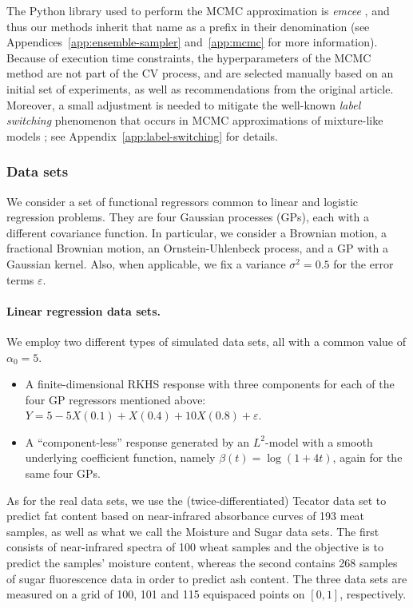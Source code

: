 \documentclass{article}
\numberwithin{equation}{section}
\theoremstyle{plain}
\renewcommand{\epsilon}{\varepsilon}
\begin{document}
The Python library used to perform the MCMC approximation is \textit{emcee} \citep{foreman2013emcee}, and thus our methods inherit that name as a prefix in their denomination (see Appendices~\ref{app:ensemble-sampler} and~\ref{app:mcmc} for more information). Because of execution time constraints, the hyperparameters of the MCMC method are not part of the CV process, and are selected manually based on an initial set of experiments, as well as recommendations from the original article. Moreover, a small adjustment is needed to mitigate the well-known \textit{label switching} phenomenon that occurs in MCMC approximations of mixture-like models \citep[e.g.][]{stephens2000dealing}; see Appendix~\ref{app:label-switching} for details.

\subsubsection*{Data sets}

We consider a set of functional regressors common to linear and logistic regression problems. They are four Gaussian processes (GPs), each with a different covariance function. In particular, we consider a Brownian motion, a fractional Brownian motion, an Ornstein-Uhlenbeck process, and a GP with a Gaussian kernel. Also, when applicable, we fix a variance \(\sigma^2=0.5\) for the error terms \(\epsilon\).

\paragraph{Linear regression data sets.} We employ two different types of simulated data sets, all with a common value of \(\alpha_0=5\).
\begin{itemize}
  \item A finite-dimensional RKHS response with three components for each of the four GP regressors mentioned above: \(Y=5 -5X(0.1) + X(0.4) + 10X(0.8) + \epsilon\).
  \item A ``component-less'' response generated by an \(L^2\)-model with a smooth underlying coefficient function, namely \(\beta(t)=\log(1+4t)\), again for the same four GPs.
\end{itemize}
As for the real data sets, we use the (twice-differentiated) Tecator data set \citep{borggaard1992optimal} to predict fat content based on near-infrared absorbance curves of 193 meat samples, as well as what we call the Moisture \citep{kalivas1997two} and Sugar \citep{bro1999exploratory} data sets. The first consists of near-infrared spectra of 100 wheat samples and the objective is to predict the samples' moisture content, whereas the second contains 268 samples of sugar fluorescence data in order to predict ash content. The three data sets are measured on a grid of 100, 101 and 115 equispaced points on \([0, 1]\), respectively.
\end{document}
